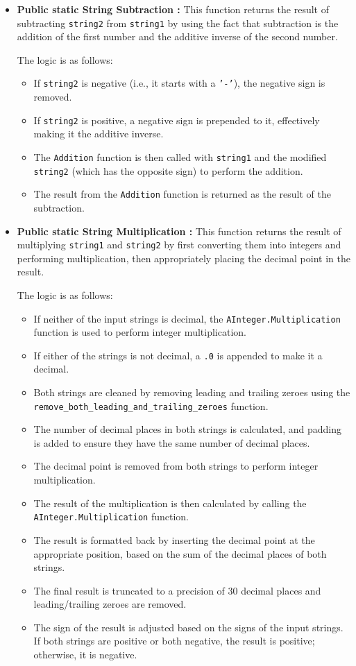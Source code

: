 \documentclass{article}
\begin{document}
\begin{itemize}
\item \textbf{Public static String Subtraction :} 
This function returns the result of subtracting \texttt{string2} from \texttt{string1} by using the fact that subtraction is the addition of the first number and the additive inverse of the second number.

The logic is as follows:
\begin{itemize}
    \item If \texttt{string2} is negative (i.e., it starts with a \texttt{'-'}), the negative sign is removed.
    \item If \texttt{string2} is positive, a negative sign is prepended to it, effectively making it the additive inverse.
    \item The \texttt{Addition} function is then called with \texttt{string1} and the modified \texttt{string2} (which has the opposite sign) to perform the addition.
    \item The result from the \texttt{Addition} function is returned as the result of the subtraction. \\
\end{itemize}

\item \textbf{Public static String Multiplication :} 
This function returns the result of multiplying \texttt{string1} and \texttt{string2} by first converting them into integers and performing multiplication, then appropriately placing the decimal point in the result.

The logic is as follows:
\begin{itemize}
    \item If neither of the input strings is decimal, the \texttt{AInteger.Multiplication} function is used to perform integer multiplication.
    \item If either of the strings is not decimal, a \texttt{.0} is appended to make it a decimal.
    \item Both strings are cleaned by removing leading and trailing zeroes using the \texttt{remove\_both\_leading\_and\_trailing\_zeroes} function.
    \item The number of decimal places in both strings is calculated, and padding is added to ensure they have the same number of decimal places.
    \item The decimal point is removed from both strings to perform integer multiplication.
    \item The result of the multiplication is then calculated by calling the \texttt{AInteger.Multiplication} function.
    \item The result is formatted back by inserting the decimal point at the appropriate position, based on the sum of the decimal places of both strings.
    \item The final result is truncated to a precision of 30 decimal places and leading/trailing zeroes are removed.
    \item The sign of the result is adjusted based on the signs of the input strings. If both strings are positive or both negative, the result is positive; otherwise, it is negative.
\end{itemize}


\end{itemize}
\end{document}
